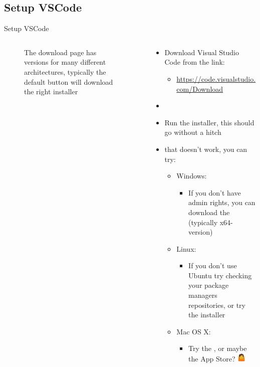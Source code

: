 \documentclass[aspectratio=169]{beamer}
\begin{document}
\subsection{Setup VSCode}
\begin{frame}{Setup VSCode}
\begin{columns}
	\begin{column}{0.5\textwidth}
		\begin{figure}
  			\caption{The  download page has versions for many different architectures, typically the default button will download the right installer}
  			\label{fig:vscode-dl}
		\end{figure}
	\end{column}
	\begin{column}{0.5\textwidth}
		\begin{textBox}
			\begin{itemize}
				\item Download Visual Studio Code from the link:
				\begin{itemize}
					 \item \small\url{https://code.visualstudio.com/Download}
				\end{itemize}
				\item {}
				\item Run the installer, this should go without a hitch
				\item {} that doesn't work, you can try:
				\begin{itemize}
					\item Windows:
					\begin{itemize}
						\item If you don't have admin rights, you can download the  (typically x64-version)
					\end{itemize}
					\item Linux:
					\begin{itemize}
						\item If you don't use Ubuntu try checking your package managers repositories, or try the  installer
					\end{itemize}
					\item Mac OS X:
					\begin{itemize}
						\item Try the , or maybe the App Store?  \includegraphics[height=12pt, keepaspectratio=true]{assets/pictures/shrug.png}
					\end{itemize}
				\end{itemize}
			\end{itemize}
		\end{textBox}
	\end{column}
\end{columns}
\end{frame}
\end{document}
